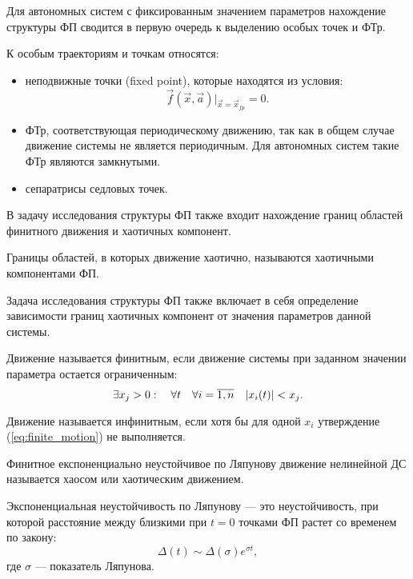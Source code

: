 Для автономных систем с фиксированным значением параметров нахождение структуры ФП сводится в первую очередь к выделению особых точек и ФТр.

К особым траекториям и точкам относятся:

\begin{itemize}
	\item неподвижные точки (fixed point), которые находятся из условия:
			$$\vec{f}(\vec{x}, \vec{a}) \Big|_{\vec{x}=\vec{x}_{fp}}=0.$$
	\item ФТр, соответствующая периодическому движению, так как в общем случае движение системы не является периодичным. Для автономных систем такие ФТр являются замкнутыми.
	\item сепаратрисы седловых точек.
\end{itemize}

В задачу исследования структуры ФП также входит нахождение границ областей финитного движения и хаотичных компонент.

\begin{definition}
	Границы областей, в которых движение хаотично, называются хаотичными компонентами ФП.
\end{definition}

Задача исследования структуры ФП также включает в себя определение зависимости границ хаотичных компонент от значения параметров данной системы.

\begin{definition}
	Движение называется финитным, если движение системы при заданном значении параметра остается ограниченным:
	\begin{equation}\label{eq:finite_motion}
		\exists x_j>0 : \quad \forall t \quad \forall i=\overline{1,n}\quad  \lvert x_i(t)\rvert<x_j.
	\end{equation}
\end{definition}

\begin{definition}
	Движение называется инфинитным, если хотя бы для одной $x_i$ утверждение (\ref{eq:finite_motion}) не выполняется.
\end{definition}

\begin{definition}
	Финитное експоненциально неустойчивое по Ляпунову движение нелинейной ДС называется хаосом или хаотическим движением. 
\end{definition}

\begin{definition}
	Экспоненциальная неустойчивость по Ляпунову --- это неустойчивость, при которой расстояние между близкими при $t=0$ точками ФП растет со временем по закону:
	$$\Delta(t) \sim \Delta(\sigma)e^{\sigma t},$$
	где $\sigma$ --- показатель Ляпунова.
\end{definition}

